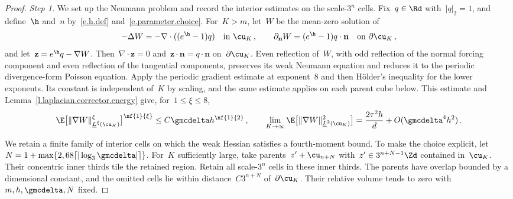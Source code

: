 \documentclass[11pt]{amsart}
\begin{document}
\begin{proof}
\emph{Step 1.} We set up the Neumann problem and record the interior estimates on the scale-$3^n$ cells. Fix~$q\in\Rd$ with~$|q|_2=1$, and define~$\h$ and~$n$ by~\eqref{e.h.def} and~\eqref{e.parameter.choice}.  For~$K>m$, let~$W$ be the mean-zero solution of
	\begin{equation*}
		-\Delta W=-\nabla\cdot((e^\h-1)q)
		\quad\text{in }\cu_K\,,
		\qquad
		\partial_{\mathbf n}W=(e^\h-1)q\cdot\mathbf n
		\quad\text{on }\partial\cu_K\,,
	\end{equation*}
	and let~$\mathbf z=e^\h q-\nabla W$.  Then~$\nabla\cdot\mathbf z=0$ and~$\mathbf z\cdot\mathbf n=q\cdot\mathbf n$ on~$\partial\cu_K$. Even reflection of~$W$, with odd reflection of the normal forcing component and even reflection of the tangential components, preserves its weak Neumann equation and reduces it to the periodic divergence-form Poisson equation. Apply the periodic gradient estimate at exponent~$8$ and then H\"older's inequality for the lower exponents. Its constant is independent of~$K$ by scaling, and the same estimate applies on each parent cube below. This estimate and Lemma~\ref{l.laplacian.corrector.energy} give, for~$1\leq\xi\leq8$,
	\begin{equation*}
		\E\bigl[\|\nabla W\|_{\underline L^\xi(\cu_K)}^\xi\bigr]^{\nf{1}{\xi}}
		\leq C\gmcdelta h^{\nf{1}{2}}\,,
		\qquad
		\lim_{K\to\infty}
		\E\bigl[\|\nabla W\|_{\underline L^2(\cu_K)}^2\bigr]
		=
		\frac{2\tau^2h}{d}+O(\gmcdelta^4h^2)\,.
	\end{equation*}

\smallskip

    We retain a finite family of interior cells on which the weak Hessian satisfies a fourth-moment bound. To make the choice explicit, let~$N=1+\max\{2,68\lceil|\log_3\gmcdelta|\rceil\}$. For~$K$ sufficiently large, take parents~$z'+\cu_{n+N}$ with~$z'\in3^{n+N-1}\Zd$ contained in~$\cu_K$. Their concentric inner thirds tile the retained region. Retain all scale-$3^n$ cells in these inner thirds. The parents have overlap bounded by a dimensional constant, and the omitted cells lie within distance~$C3^{n+N}$ of~$\partial\cu_K$. Their relative volume tends to zero with~$m,h,\gmcdelta,N$ fixed.

\smallskip


\end{proof}
\end{document}
